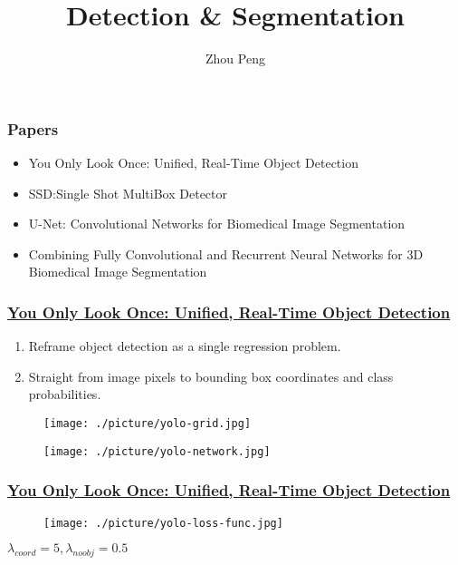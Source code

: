 \documentclass{beamer}
\begin{document}
\title{Detection \& Segmentation}
\author{Zhou Peng}
\date{}
\maketitle{}

\begin{frame}
  \frametitle{Papers}
\begin{itemize}
\item You Only Look Once: Unified, Real-Time Object Detection
\item SSD:Single Shot MultiBox Detector
\item U-Net: Convolutional Networks for Biomedical Image Segmentation
\item Combining Fully Convolutional and Recurrent Neural Networks for 3D Biomedical Image Segmentation
\end{itemize}
\end{frame}

\begin{frame}
  \frametitle{\href{https://arxiv.org/abs/1506.02640}
    {You Only Look Once: Unified, Real-Time Object Detection}}
  \begin{enumerate}
  \item Reframe object detection as a single regression problem.
  \item Straight from image pixels to bounding box coordinates and class probabilities.
  \end{enumerate}
  \begin{figure}[ht]
    \centering
    \begin{minipage}{.4\textwidth}
      \centering
      \texttt{[image: ./picture/yolo-grid.jpg]}
    \end{minipage}%
    \begin{minipage}{.6\textwidth}
      \centering
      \texttt{[image: ./picture/yolo-network.jpg]}
    \end{minipage}
  \end{figure}

\end{frame}

\begin{frame}
  \frametitle{\href{https://arxiv.org/abs/1506.02640}
    {You Only Look Once: Unified, Real-Time Object Detection}}
  \begin{figure}[!htb]
    \centering
    \texttt{[image: ./picture/yolo-loss-func.jpg]}
  \end{figure}
  \centering
  $\lambda_{coord}=5,\lambda_{noobj}=0.5$
\end{frame}  
\end{document}
